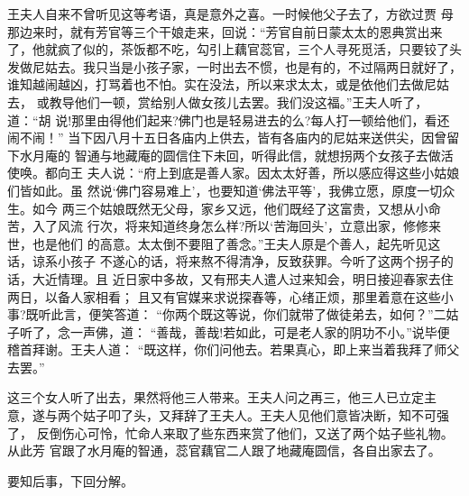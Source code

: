 王夫人自来不曾听见这等考语，真是意外之喜。一时候他父子去了，方欲过贾
母那边来时，就有芳官等三个干娘走来，回说：“芳官自前日蒙太太的恩典赏出来
了，他就疯了似的，茶饭都不吃，勾引上藕官蕊官，三个人寻死觅活，只要铰了头
发做尼姑去。我只当是小孩子家，一时出去不惯，也是有的，不过隔两日就好了，
谁知越闹越凶，打骂着也不怕。实在没法，所以来求太太，或是依他们去做尼姑去，
或教导他们一顿，赏给别人做女孩儿去罢。我们没这福。”王夫人听了，道：“胡
说!那里由得他们起来?佛门也是轻易进去的么?每人打一顿给他们，看还闹不闹！”
当下因八月十五日各庙内上供去，皆有各庙内的尼姑来送供尖，因曾留下水月庵的
智通与地藏庵的圆信住下未回，听得此信，就想拐两个女孩子去做活使唤。都向王
夫人说：“府上到底是善人家。因太太好善，所以感应得这些小姑娘们皆如此。虽
然说‘佛门容易难上’，也要知道‘佛法平等’，我佛立愿，原度一切众生。如今
两三个姑娘既然无父母，家乡又远，他们既经了这富贵，又想从小命苦，入了风流
行次，将来知道终身怎么样?所以‘苦海回头’，立意出家，修修来世，也是他们
的高意。太太倒不要阻了善念。”王夫人原是个善人，起先听见这话，谅系小孩子
不遂心的话，将来熬不得清净，反致获罪。今听了这两个拐子的话，大近情理。且
近日家中多故，又有邢夫人遣人过来知会，明日接迎春家去住两日，以备人家相看；
且又有官媒来求说探春等，心绪正烦，那里着意在这些小事?既听此言，便笑答道：
“你两个既这等说，你们就带了做徒弟去，如何？”二姑子听了，念一声佛，道：
“善哉，善哉!若如此，可是老人家的阴功不小。”说毕便稽首拜谢。王夫人道：
“既这样，你们问他去。若果真心，即上来当着我拜了师父去罢。”

这三个女人听了出去，果然将他三人带来。王夫人问之再三，他三人已立定主
意，遂与两个姑子叩了头，又拜辞了王夫人。王夫人见他们意皆决断，知不可强了，
反倒伤心可怜，忙命人来取了些东西来赏了他们，又送了两个姑子些礼物。从此芳
官跟了水月庵的智通，蕊官藕官二人跟了地藏庵圆信，各自出家去了。

要知后事，下回分解。